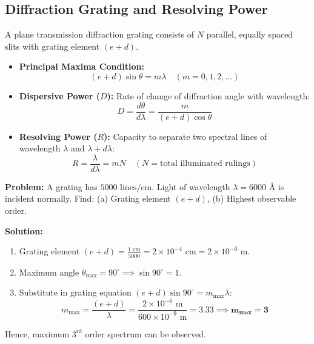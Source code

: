 \documentclass[12pt,a4paper]{article}
\begin{document}
\subsection{Diffraction Grating and Resolving Power}

A plane transmission diffraction grating consists of $N$ parallel, equally spaced slits with grating element $(e+d)$.

\begin{tcolorbox}[formulabox, title={\textbf{Grating Equations and Resolving Power}}]
\begin{itemize}[leftmargin=*, itemsep=3pt]
  \item \textbf{Principal Maxima Condition:}
  \begin{equation}
  (e+d)\sin\theta = m \lambda \quad (m = 0, 1, 2, \ldots)
  \end{equation}
  \item \textbf{Dispersive Power ($D$):} Rate of change of diffraction angle with wavelength:
  \begin{equation}
  D = \frac{d\theta}{d\lambda} = \frac{m}{(e+d)\cos\theta}
  \end{equation}
  \item \textbf{Resolving Power ($R$):} Capacity to separate two spectral lines of wavelength $\lambda$ and $\lambda + d\lambda$:
  \begin{equation}
  R = \frac{\lambda}{d\lambda} = m N \quad (N = \text{total illuminated rulings})
  \end{equation}
\end{itemize}
\end{tcolorbox}

\begin{tcolorbox}[examplebox, title={\textbf{Solved Problem 1: Grating Spectral Lines and Maximum Order}}]
\textbf{Problem:} A grating has $5000\text{ lines/cm}$. Light of wavelength $\lambda = 6000\text{ \AA}$ is incident normally. Find: (a) Grating element $(e+d)$, (b) Highest observable order.

\textbf{Solution:}\par\noindent
\begin{enumerate}[leftmargin=*, itemsep=2pt]
  \item Grating element $(e+d) = \frac{1\text{ cm}}{5000} = 2 \times 10^{-4}\text{ cm} = 2 \times 10^{-6}\text{ m}$.
  \item Maximum angle $\theta_{\max} = 90^\circ \implies \sin 90^\circ = 1$.
  \item Substitute in grating equation $(e+d)\sin 90^\circ = m_{\max} \lambda$:
   \begin{equation}
   m_{\max} = \frac{(e+d)}{\lambda} = \frac{2 \times 10^{-6}\text{ m}}{600 \times 10^{-9}\text{ m}} = 3.33 \implies \mathbf{m_{\max} = 3}
   \end{equation}
\end{enumerate}
Hence, maximum $3^{\text{rd}}$ order spectrum can be observed.
\end{tcolorbox}
\end{document}
